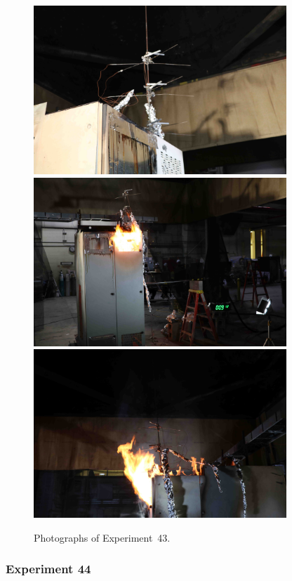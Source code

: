 \begin{figure}[p]
\centering
\includegraphics[height=2.50in]{../FIGURES/Test_43_setup} \\
\includegraphics[height=2.50in]{../FIGURES/Test_43_9_min_12_s} \\
\includegraphics[height=2.50in]{../FIGURES/Test_43_side}
\caption[Photographs of Experiment~43]{Photographs of Experiment~43.}
\label{fig:Test_43_photos}
\end{figure}


\clearpage

\subsubsection{Experiment 44}

